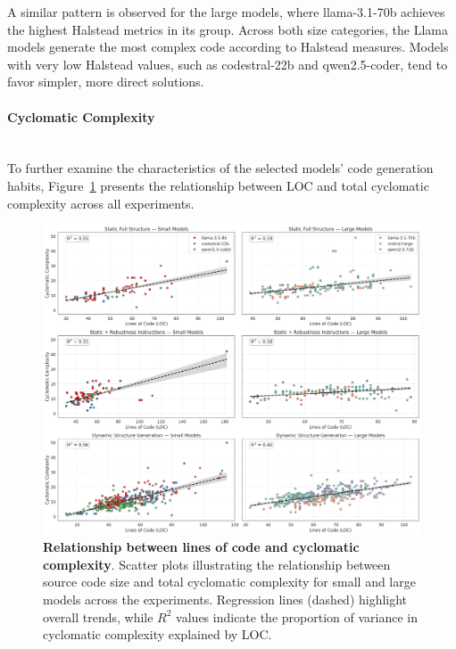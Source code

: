 \documentclass{DESSThesis}
\begin{document}
A similar pattern is observed for the large models, where llama-3.1-70b achieves the highest Halstead metrics in its group. Across both size categories, the Llama models generate the most complex code according to Halstead measures. Models with very low Halstead values, such as codestral-22b and qwen2.5-coder, tend to favor simpler, more direct solutions.

\paragraph{Cyclomatic Complexity}\mbox{}\\

\noindent To further examine the characteristics of the selected models' code generation habits, Figure~\ref{fig:cyc_loc_correlation} presents the relationship between LOC and total cyclomatic complexity across all experiments.

\begin{figure}[ht]
    \centering
    \includegraphics[width=\linewidth]{img/Results/First Experimental Phase/Cyc_LOC_correlation.png}
    \caption[]{\textbf{Relationship between lines of code and cyclomatic complexity}. Scatter plots illustrating the relationship between source code size and total cyclomatic complexity for small and large models across the experiments. Regression lines (dashed) highlight overall trends, while $R^2$ values indicate the proportion of variance in cyclomatic complexity explained by LOC.}
    \label{fig:cyc_loc_correlation}
\end{figure}
\end{document}
